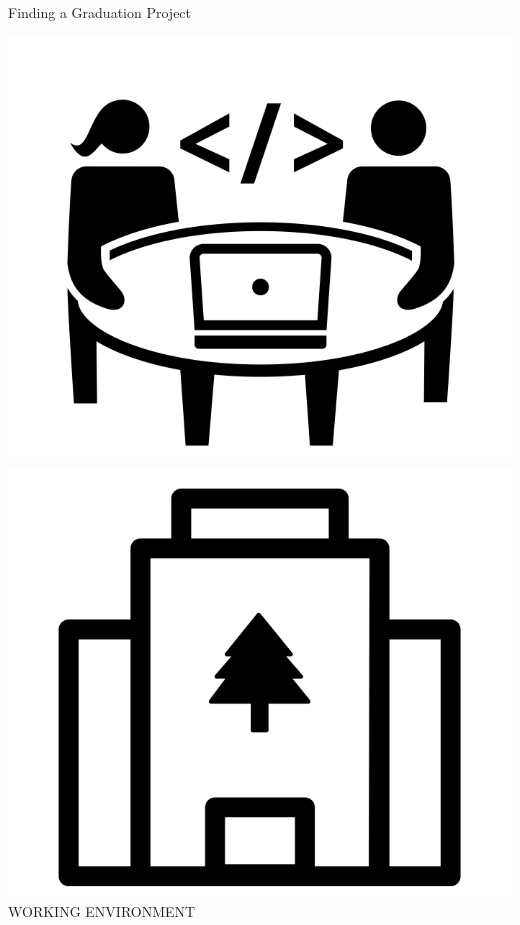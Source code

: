\documentclass[12pt, aspectratio=43]{beamer}
\begin{document}
\begin{frame}{Finding a Graduation Project}
\begin{center}
    \includegraphics[scale=0.2]{images/WorkingEnvironment.png}
    \includegraphics[scale=0.2]{images/OfficeEnvironment.png} \\
    WORKING ENVIRONMENT
\end{center}
\end{frame}
\end{document}
